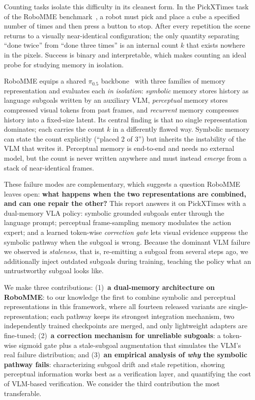 \documentclass{article}
\begin{document}
Counting tasks isolate this difficulty in its cleanest form. In the PickXTimes task of the RoboMME benchmark~\cite{robomme2026}, a robot must pick and place a cube a specified number of times and then press a button to stop. After every repetition the scene returns to a visually near-identical configuration; the only quantity separating ``done twice'' from ``done three times'' is an internal count $k$ that exists nowhere in the pixels. Success is binary and interpretable, which makes counting an ideal probe for studying memory in isolation.

RoboMME equips a shared $\pi_{0.5}$ backbone~\cite{pi05} with three families of memory representation and evaluates each \emph{in isolation}: \emph{symbolic} memory stores history as language subgoals written by an auxiliary VLM, \emph{perceptual} memory stores compressed visual tokens from past frames, and \emph{recurrent} memory compresses history into a fixed-size latent. Its central finding is that no single representation dominates; each carries the count $k$ in a differently flawed way. Symbolic memory can state the count explicitly (``placed 2 of 3'') but inherits the instability of the VLM that writes it. Perceptual memory is end-to-end and needs no external model, but the count is never written anywhere and must instead \emph{emerge} from a stack of near-identical frames.

These failure modes are complementary, which suggests a question RoboMME leaves open: \textbf{what happens when the two representations are combined, and can one repair the other?} This report answers it on PickXTimes with a dual-memory VLA policy: symbolic grounded subgoals enter through the language prompt; perceptual frame-sampling memory modulates the action expert; and a learned token-wise \emph{correction gate} lets visual evidence suppress the symbolic pathway when the subgoal is wrong. Because the dominant VLM failure we observed is \emph{staleness}, that is, re-emitting a subgoal from several steps ago, we additionally inject outdated subgoals during training, teaching the policy what an untrustworthy subgoal looks like.

We make three contributions: (1)~\textbf{a dual-memory architecture on RoboMME}: to our knowledge the first to combine symbolic and perceptual representations in this framework, where all fourteen released variants are single-representation; each pathway keeps its strongest integration mechanism, two independently trained checkpoints are merged, and only lightweight adapters are fine-tuned; (2)~\textbf{a correction mechanism for unreliable subgoals}: a token-wise sigmoid gate plus a stale-subgoal augmentation that simulates the VLM's real failure distribution; and (3)~\textbf{an empirical analysis of \emph{why} the symbolic pathway fails}: characterizing subgoal drift and stale repetition, showing perceptual information works best as a verification layer, and quantifying the cost of VLM-based verification. We consider the third contribution the most transferable.
\end{document}
